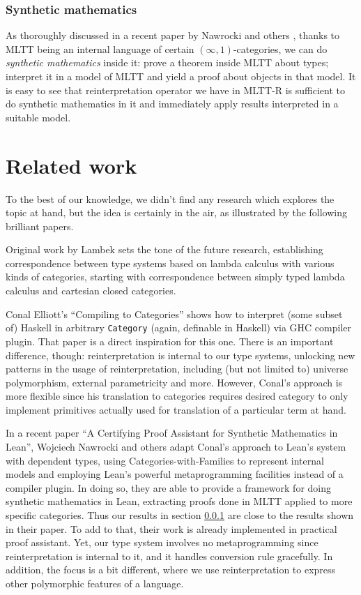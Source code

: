 \documentclass[acmsmall, review, screen, authorversion]{acmart}
\begin{document}
\subsubsection{Synthetic mathematics} \label{MLTT-R-synthetic}

As thoroughly discussed in a recent paper by Nawrocki and others
\cite{Nawrocki:Lean2026}, thanks to MLTT being an internal language
of certain $(\infty,1)$-categories, we can do \textit{synthetic
mathematics} inside it: prove a theorem inside MLTT about types;
interpret it in a model of MLTT and yield a proof about objects in
that model. It is easy to see that reinterpretation operator we have
in MLTT-R is sufficient to do synthetic mathematics in it and
immediately apply results interpreted in a suitable model.

\section{Related work}

To the best of our knowledge, we didn't find any research which
explores the topic at hand, but the idea is certainly in the air, as
illustrated by the following brilliant papers.

Original work by Lambek \cite{Lambek1980} sets the tone of the future
research, establishing correspondence between type systems based on
lambda calculus with various kinds of categories, starting with
correspondence between simply typed lambda calculus and cartesian
closed categories.

Conal Elliott's ``Compiling to Categories''
\cite{Elliott:Compcat2017} shows how to interpret (some subset of)
Haskell in arbitrary \texttt{Category} (again, definable in Haskell)
via GHC compiler plugin. That paper is a direct inspiration for this
one. There is an important difference, though: reinterpretation is
internal to our type systems, unlocking new patterns in the usage of
reinterpretation, including (but not limited to) universe
polymorphism, external parametricity and more. However, Conal's
approach is more flexible since his translation to categories
requires desired category to only implement primitives actually used
for translation of a particular term at hand.

In a recent paper ``A Certifying Proof Assistant for Synthetic
Mathematics in Lean'', Wojciech Nawrocki and others
\cite{Nawrocki:Lean2026} adapt Conal's approach to Lean's system with
dependent types, using Categories-with-Families to represent internal
models and employing Lean's powerful metaprogramming facilities
instead of a compiler plugin. In doing so, they are able to provide a
framework for doing synthetic mathematics in Lean, extracting proofs
done in MLTT applied to more specific categories. Thus our results in
section \ref{MLTT-R-synthetic} are close to the results shown in
their paper. To add to that, their work is already implemented in
practical proof assistant. Yet, our type system involves no
metaprogramming since reinterpretation is internal to it, and it
handles conversion rule gracefully. In addition, the focus is a bit
different, where we use reinterpretation to express other polymorphic
features of a language.
\end{document}
